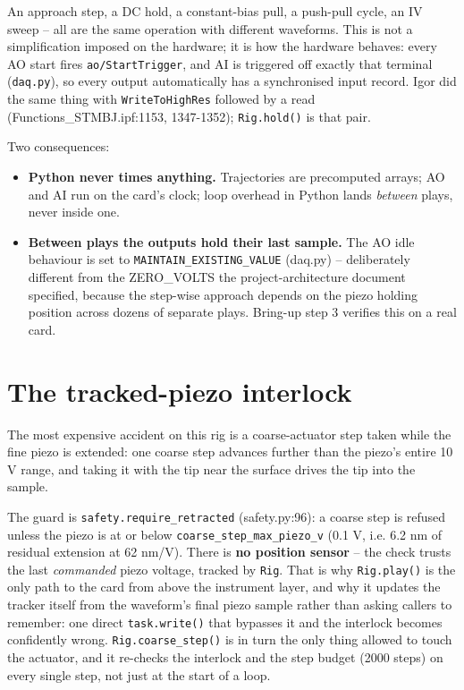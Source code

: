 An approach step, a DC hold, a constant-bias pull, a push-pull cycle, an IV sweep -- all are the same operation with different waveforms. This is not a simplification imposed on the hardware; it is how the hardware behaves: every AO start fires \texttt{ao/\discretionary{}{}{}Start\discretionary{}{}{}Trigger}, and AI is triggered off exactly that terminal (\texttt{daq.\discretionary{}{}{}py}), so every output automatically has a synchronised input record. Igor did the same thing with \texttt{Write\discretionary{}{}{}To\discretionary{}{}{}High\discretionary{}{}{}Res} followed by a read (Functions\_STMBJ.ipf:1153, 1347-1352); \texttt{Rig.\discretionary{}{}{}hold()} is that pair.

Two consequences:

\begin{itemize}[leftmargin=*]
\item \textbf{Python never times anything.} Trajectories are precomputed arrays; AO and AI run on the card's clock; loop overhead in Python lands \emph{between} plays, never inside one.
\item \textbf{Between plays the outputs hold their last sample.} The AO idle behaviour is set to \texttt{MAINTAIN\_\discretionary{}{}{}EXISTING\_\discretionary{}{}{}VALUE} (daq.py) -- deliberately different from the ZERO\_VOLTS the project-architecture document specified, because the step-wise approach depends on the piezo holding position across dozens of separate plays. Bring-up step 3 verifies this on a real card.
\end{itemize}

\section{The tracked-piezo interlock}

The most expensive accident on this rig is a coarse-actuator step taken while the fine piezo is extended: one coarse step advances further than the piezo's entire 10 V range, and taking it with the tip near the surface drives the tip into the sample.

The guard is \texttt{safety.\discretionary{}{}{}require\_\discretionary{}{}{}retracted} (safety.py:96): a coarse step is refused unless the piezo is at or below \texttt{coarse\_\discretionary{}{}{}step\_\discretionary{}{}{}max\_\discretionary{}{}{}piezo\_\discretionary{}{}{}v} (0.1 V, i.e. 6.2 nm of residual extension at 62 nm/V). There is \textbf{no position sensor} -- the check trusts the last \emph{commanded} piezo voltage, tracked by \texttt{Rig}. That is why \texttt{Rig.\discretionary{}{}{}play()} is the only path to the card from above the instrument layer, and why it updates the tracker itself from the waveform's final piezo sample rather than asking callers to remember: one direct \texttt{task.\discretionary{}{}{}write()} that bypasses it and the interlock becomes confidently wrong. \texttt{Rig.\discretionary{}{}{}coarse\_\discretionary{}{}{}step()} is in turn the only thing allowed to touch the actuator, and it re-checks the interlock and the step budget (2000 steps) on every single step, not just at the start of a loop.

